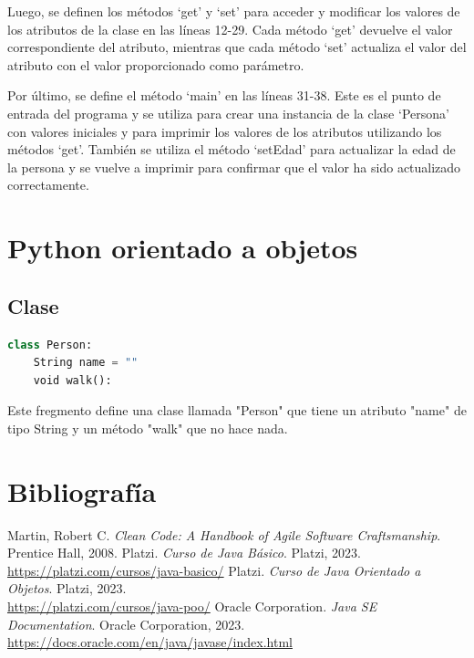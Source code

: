 \documentclass[executivepaper]{article}
\begin{document}
Luego, se definen los métodos \enquote*{get} y \enquote*{set} para acceder y modificar los valores de los atributos de la clase en las líneas 12-29. Cada método \enquote*{get} devuelve el valor correspondiente del atributo, mientras que cada método \enquote*{set} actualiza el valor del atributo con el valor proporcionado como parámetro.

Por último, se define el método \enquote*{main} en las líneas 31-38. Este es el punto de entrada del programa y se utiliza para crear una instancia de la clase \enquote*{Persona} con valores iniciales y para imprimir los valores de los atributos utilizando los métodos \enquote*{get}. También se utiliza el método \enquote*{setEdad} para actualizar la edad de la persona y se vuelve a imprimir para confirmar que el valor ha sido actualizado correctamente.


\newpage
\section{Python orientado a objetos}
\subsection{Clase}
\begin{lstlisting}[language=Python]
class Person:
    String name = ""
    void walk():

\end{lstlisting}
Este fregmento define una clase llamada "Person" que tiene un atributo "name" de tipo String y un método "walk" que no hace nada.

\newpage
\section{Bibliografía}
\begin{thebibliography}{9}
 Martin, Robert C. \textit{Clean Code: A Handbook of Agile Software Craftsmanship}. Prentice Hall, 2008.
 Platzi. \textit{Curso de Java Básico}. Platzi, 2023.\\ \url{https://platzi.com/cursos/java-basico/}
 Platzi. \textit{Curso de Java Orientado a Objetos}. Platzi, 2023.\\ \url{https://platzi.com/cursos/java-poo/}
 Oracle Corporation. \textit{Java SE Documentation}. Oracle Corporation, 2023.\\ \url{https://docs.oracle.com/en/java/javase/index.html}
\end{thebibliography}
\end{document}
